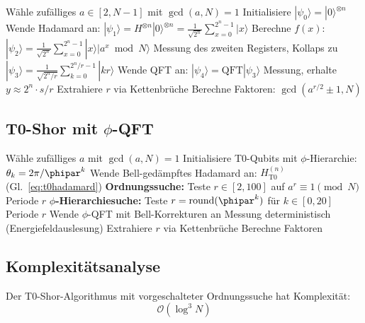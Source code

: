 \begin{algorithm}[H]
	\caption{Standard Shor-Algorithmus}
	\begin{algorithmic}[1]
		\STATE Wähle zufälliges $a \in [2, N-1]$ mit $\gcd(a, N) = 1$
		\STATE Initialisiere $|\psi_0\rangle = |0\rangle^{\otimes n}$
		\STATE Wende Hadamard an: $|\psi_1\rangle = H^{\otimes n}|0\rangle^{\otimes n} = \frac{1}{\sqrt{2^n}}\sum_{x=0}^{2^n-1}|x\rangle$
		\STATE Berechne $f(x)$: $|\psi_2\rangle = \frac{1}{\sqrt{2^n}}\sum_{x=0}^{2^n-1}|x\rangle|a^x \bmod N\rangle$
		\STATE Messung des zweiten Registers, Kollaps zu $|\psi_3\rangle = \frac{1}{\sqrt{2^n/r}}\sum_{k=0}^{2^n/r-1}|kr\rangle$
		\STATE Wende QFT an: $|\psi_4\rangle = \text{QFT}|\psi_3\rangle$
		\STATE Messung, erhalte $y \approx 2^n \cdot s/r$
		\STATE Extrahiere $r$ via Kettenbrüche
		\STATE Berechne Faktoren: $\gcd(a^{r/2} \pm 1, N)$
	\end{algorithmic}
\end{algorithm}

\subsection{T0-Shor mit $\phi$-QFT}

\begin{algorithm}[H]
	\caption{T0-Shor-Algorithmus}
	\begin{algorithmic}[1]
		\STATE Wähle zufälliges $a$ mit $\gcd(a, N) = 1$
		\STATE Initialisiere T0-Qubits mit $\phi$-Hierarchie: $\theta_k = 2\pi/\phipar^k$
		\STATE Wende Bell-gedämpftes Hadamard an: $H_{\text{T0}}^{(n)}$ (Gl.~\ref{eq:t0hadamard})
		\STATE \textbf{Ordnungssuche:} Teste $r \in [2, 100]$ auf $a^r \equiv 1 \pmod{N}$
		 \RETURN Periode $r$
		\ENDIF
		\STATE \textbf{$\phi$-Hierarchiesuche:} Teste $r = \text{round}(\phipar^k)$ für $k \in [0, 20]$
		 \RETURN Periode $r$
		\ENDIF
		\STATE Wende $\phi$-QFT mit Bell-Korrekturen an
		\STATE Messung deterministisch (Energiefeldauslesung)
		\STATE Extrahiere $r$ via Kettenbrüche
		\STATE Berechne Faktoren
	\end{algorithmic}
\end{algorithm}

\subsection{Komplexitätsanalyse}

\begin{proposition}
	Der T0-Shor-Algorithmus mit vorgeschalteter Ordnungssuche hat Komplexität:
	\begin{equation}
		\mathcal{O}\left(\log^3 N\right)
	\end{equation}
\end{proposition}

